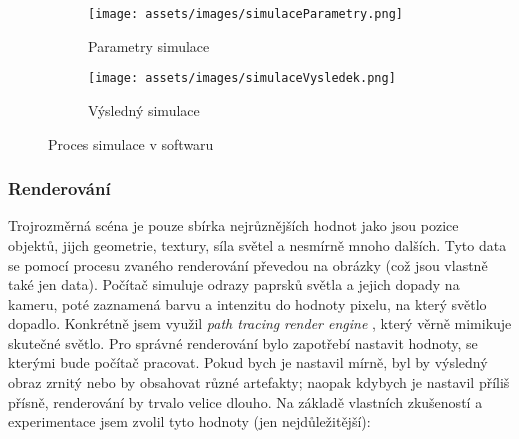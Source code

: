 \begin{figure}[H]
    \centering
    \begingroup
    \makeatletter
    \renewcommand\thesubfigure{\thefigure~--~\@nameuse{subfiglabel@\alph{subfigure}}}
    \newcommand{\subfiglabel@a}{vlevo}
    \newcommand{\subfiglabel@b}{vpravo}
    \captionsetup[subfigure]{labelformat=simple, labelsep=colon}
    \renewcommand\p@subfigure{}
    \makeatother
    \begin{subfigure}{0.35\textwidth}
        \centering
        \texttt{[image: assets/images/simulaceParametry.png]}
        \caption{Parametry simulace\\\jaObr}
    \end{subfigure}%
    \begin{subfigure}{0.6\textwidth}
        \centering
        \texttt{[image: assets/images/simulaceVysledek.png]}
        \caption{Výsledný simulace \jaObr}
    \end{subfigure}
    \endgroup
    \caption{Proces simulace v softwaru }
    \label{obr:simulace}
\end{figure}



\newpage

\subsubsection{Renderování}\label{sc:renderovani}
{Trojrozměrná scéna je pouze sbírka nejrůznějších hodnot jako jsou pozice objektů, jijch geometrie, textury, síla světel a nesmírně mnoho dalších. Tyto data se pomocí procesu zvaného renderování převedou na obrázky (což jsou vlastně také jen data). Počítač simuluje odrazy paprsků světla a jejich dopady na kameru, poté zaznamená barvu a intenzitu do hodnoty pixelu, na který světlo dopadlo. Konkrétně jsem využil \textit{path tracing} \textit{render engine} , který věrně mimikuje skutečné světlo.}\odst
{Pro správné renderování bylo zapotřebí nastavit hodnoty, se kterými bude počítač pracovat. Pokud bych je nastavil mírně, byl by výsledný obraz zrnitý nebo by obsahovat různé artefakty; naopak kdybych je nastavil příliš přísně, renderování by trvalo velice dlouho. Na základě vlastních zkušeností a experimentace jsem zvolil tyto hodnoty (jen nejdůležitější): }

